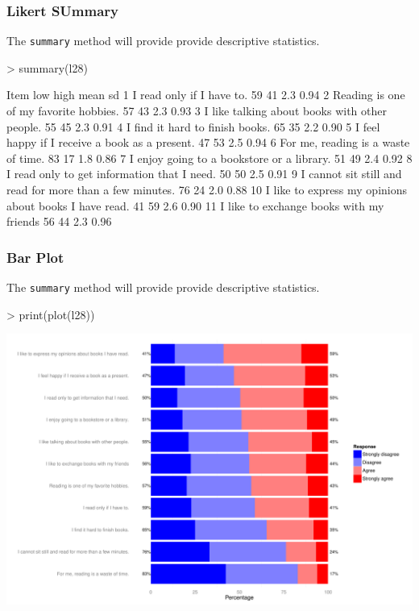 \documentclass[10pt,slidestop,mathserif,c]{beamer}
\begin{document}
\begin{frame}[containsverbatim,fragile,shrink=20]
	\frametitle{Likert SUmmary}
    The \texttt{summary} method will provide provide descriptive statistics.
    
\begin{Schunk}
\begin{Sinput}
> summary(l28)
\end{Sinput}
\begin{Soutput}
                                                       Item low high mean   sd
1                                 I read only if I have to.  59   41  2.3 0.94
2                    Reading is one of my favorite hobbies.  57   43  2.3 0.93
3             I like talking about books with other people.  55   45  2.3 0.91
4                           I find it hard to finish books.  65   35  2.2 0.90
5            I feel happy if I receive a book as a present.  47   53  2.5 0.94
6                       For me, reading is a waste of time.  83   17  1.8 0.86
7                I enjoy going to a bookstore or a library.  51   49  2.4 0.92
8               I read only to get information that I need.  50   50  2.5 0.91
9  I cannot sit still and read for more than a few minutes.  76   24  2.0 0.88
10   I like to express my opinions about books I have read.  41   59  2.6 0.90
11                 I like to exchange books with my friends  56   44  2.3 0.96
\end{Soutput}
\end{Schunk}
\end{frame}

\begin{frame}
	\frametitle{Bar Plot}
    The \texttt{summary} method will provide provide descriptive statistics.
    
\begin{Schunk}
\begin{Sinput}
> print(plot(l28))
\end{Sinput}
\end{Schunk}
\includegraphics{Slides-likert-bar}
\end{frame}
\end{document}
